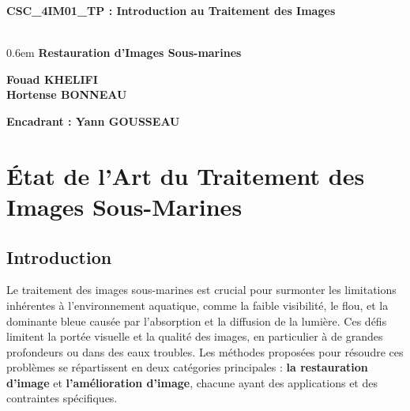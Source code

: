 \documentclass[10pt, a4paper]{extarticle}
\numberwithin{equation}{section}
\numberwithin{figure}{section}
\begin{document}
\fancyhf{}
\renewcommand{\headrulewidth}{.6pt}
 
\pagestyle{fancy}

\vspace*{40mm}
\begin{center}
    \Huge
    
    \textbf{CSC\_4IM01\_TP : Introduction au Traitement des Images}\vspace*{1mm}\\
\vspace*{26mm}\\
\Huge
\fboxsep0.6em
\textbf{Restauration d'Images Sous-marines}
\vspace*{11mm}\\
\end{center}
\vspace*{50mm}
\begin{center}
\textbf{\Large Fouad KHELIFI}\vspace{2mm}\\ 
\textbf{\Large Hortense BONNEAU} 
\end{center}
\vspace*{25mm}
\textbf{Encadrant : Yann GOUSSEAU} 
\newpage
\fancyhf{}
\renewcommand{\headrulewidth}{.6pt}
\fancyhead[R]{\small \leftmark}
\setlength{\headheight}{10pt}
\renewcommand{\footrulewidth}{.6pt}
\fancyfoot[C]{\thepage}
\pagestyle{fancy}
\tableofcontents
\newpage

\section{\'Etat de l'Art du Traitement des Images Sous-Marines}
\subsection{Introduction}
\par Le traitement des images sous-marines est crucial pour surmonter les limitations inhérentes à l'environnement aquatique, comme la faible visibilité, le flou, et la dominante bleue causée par l'absorption et la diffusion de la lumière. Ces défis limitent la portée visuelle et la qualité des images, en particulier à de grandes profondeurs ou dans des eaux troubles. Les méthodes proposées pour résoudre ces problèmes se répartissent en deux catégories principales : \textbf{la restauration d'image} et \textbf{l'amélioration d'image}, chacune ayant des applications et des contraintes spécifiques.
\end{document}
